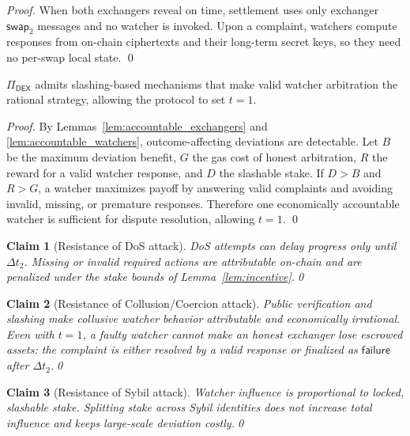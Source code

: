 \documentclass[runningheads]{llncs}
\newtheorem{myClaim}{Claim}
\newcommand{\failure}{\mathsf{failure}}
\begin{document}
\begin{proof}
When both exchangers reveal on time, settlement uses only exchanger
\(\mathsf{swap}_2\) messages and no watcher is invoked. Upon a complaint,
watchers compute responses from on-chain ciphertexts and their long-term secret
keys, so they need no per-swap local state.
\qed
\end{proof}

\begin{lemma}
\label{lem:incentive}
\(\Pi_{\mathsf{DEX}}\) admits slashing-based mechanisms that make valid watcher
arbitration the rational strategy, allowing the protocol to set \(t=1\).
\end{lemma}

\begin{proof}
By Lemmas~\ref{lem:accountable_exchangers} and
\ref{lem:accountable_watchers}, outcome-affecting deviations are detectable. Let
\(B\) be the maximum deviation benefit, \(G\) the gas cost of honest arbitration,
\(R\) the reward for a valid watcher response, and \(D\) the slashable stake. If
\(D>B\) and \(R>G\), a watcher maximizes payoff by answering valid complaints
and avoiding invalid, missing, or premature responses. Therefore one
economically accountable watcher is sufficient for dispute resolution, allowing
\(t=1\).
\qed
\end{proof}


\begin{myClaim}[Resistance of DoS attack]\label{lem:dos}
DoS attempts can delay progress only until \(\Delta t_2\). Missing or invalid
required actions are attributable on-chain and are penalized under the stake
bounds of Lemma~\ref{lem:incentive}.\qed
\end{myClaim}


\begin{myClaim}[Resistance of Collusion/Coercion attack]\label{lem:collusion}
Public verification and slashing make collusive watcher behavior attributable
and economically irrational. Even with \(t=1\), a faulty watcher cannot make an
honest exchanger lose escrowed assets: the complaint is either resolved by a
valid response or finalized as \(\failure\) after \(\Delta t_2\).\qed
\end{myClaim}

\begin{myClaim}[Resistance of Sybil attack]\label{lem:sybil}
Watcher influence is proportional to locked, slashable stake. Splitting stake
across Sybil identities does not increase total influence and keeps large-scale
deviation costly.\qed
\end{myClaim}
\end{document}
